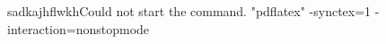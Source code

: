 \documentclass[12pt]{article}
\begin{document}
sadkajhflwkhCould not start the command.
"pdflatex" -synctex=1 -interaction=nonstopmode %
\end{document}
